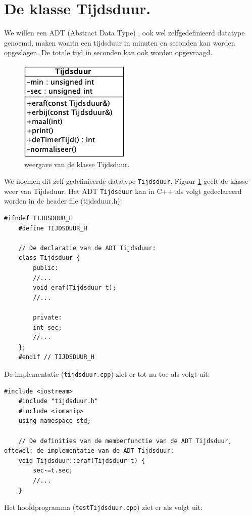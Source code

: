 \section{De klasse Tijdsduur.}

We willen een ADT (Abstract Data Type) , ook wel zelfgedefinieerd datatype genoemd, maken waarin een tijdsduur in minuten en seconden kan worden opgeslagen. De totale tijd in seconden kan ook worden opgevraagd. 
\begin{figure}[h!]
	\captionsetup{justification=centering}
	\includegraphics[width=0.28 \linewidth]{figuren/tijdsduur}
	\centering
	\caption{weergave van de klasse Tijdsduur. }
	\label{fig:tijdsduurKlas}
\end{figure}
We noemen dit zelf gedefinieerde datatype \texttt{Tijdsduur}. Figuur \ref{fig:tijdsduurKlas} geeft de klasse weer van Tijdsduur.
Het ADT \texttt{Tijdsduur} kan in C++ als volgt gedeclareerd worden in de header file (tijdsduur.h):

\begin{lstlisting}[caption= de headerfile van de klasse \texttt{Tijdsduur},label={lst:tijdsdHeader},numbers=none]		
	#ifndef TIJDSDUUR_H
	#define TIJDSDUUR_H
	
	// De declaratie van de ADT Tijdsduur:
	class Tijdsduur {
		public:
		//...
		void eraf(Tijdsduur t);
		//...
		
		private:
		int sec;
		//...
	};
	#endif // TIJDSDUUR_H
\end{lstlisting}

De implementatie (\texttt{tijdsduur.cpp}) ziet er tot nu toe als volgt uit:
\begin{lstlisting}[caption= de implementatiefile van de klasse \texttt{Tijdsduur},label={lst:tijdsdImpl},numbers=none]
	#include <iostream>
	#include "tijdsduur.h"
	#include <iomanip>
	using namespace std;
	
	// De definities van de memberfunctie van de ADT Tijdsduur, oftewel: de implementatie van de ADT Tijdsduur:
	void Tijdsduur::eraf(Tijdsduur t) {
		sec-=t.sec;
		//...
	}
\end{lstlisting}

Het hoofdprogramma (\texttt{testTijdsduur.cpp}) ziet er als volgt uit:

